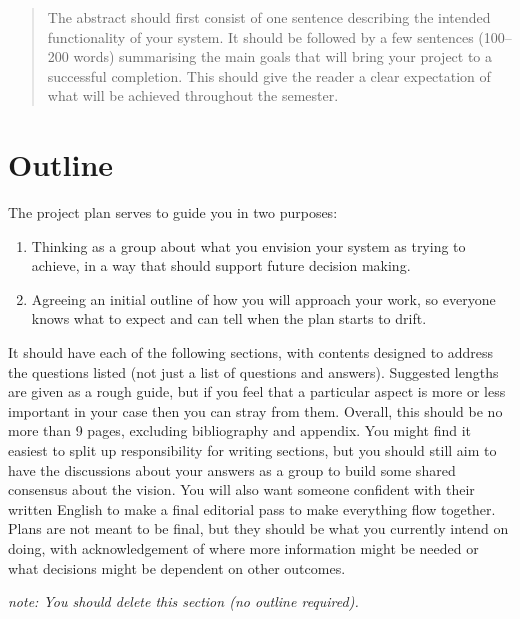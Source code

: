 \documentclass{article}
\begin{document}
 



\begin{abstract} 
The abstract should first consist of one sentence describing the intended functionality of your system. It should be followed by a few sentences (100--200 words) summarising the main goals that will bring your project to a successful completion. This should give the reader a clear expectation of what will be achieved throughout the semester.
\end{abstract} 

\section*{Outline}
\label{sec:intro}
The project plan serves to guide you in two purposes:
\begin{enumerate}
\item Thinking as a group about what you envision your system as trying to achieve, in a way that should support future decision making.
\item Agreeing an initial outline of how you will approach your work, so everyone knows what to expect and can tell when the plan starts to drift.
\end{enumerate}
It should have each of the following sections, with contents designed to address the questions listed (not just a list of questions and answers). Suggested lengths are given as a rough guide, but if you feel that a particular aspect is more or less important in your case then you can stray from them. Overall, this should be no more than 9 pages, excluding bibliography and appendix.
You might find it easiest to split up responsibility for writing sections, but you should still aim to have the discussions about your answers as a group to build some shared consensus about the vision. You will also want someone confident with their written English to make a final editorial pass to make everything flow together.
Plans are not meant to be final, but they should be what you currently intend on doing, with acknowledgement of where more information might be needed or what decisions might be dependent on other outcomes.


\textit{note: You should delete this section (no outline required).}
\end{document}
